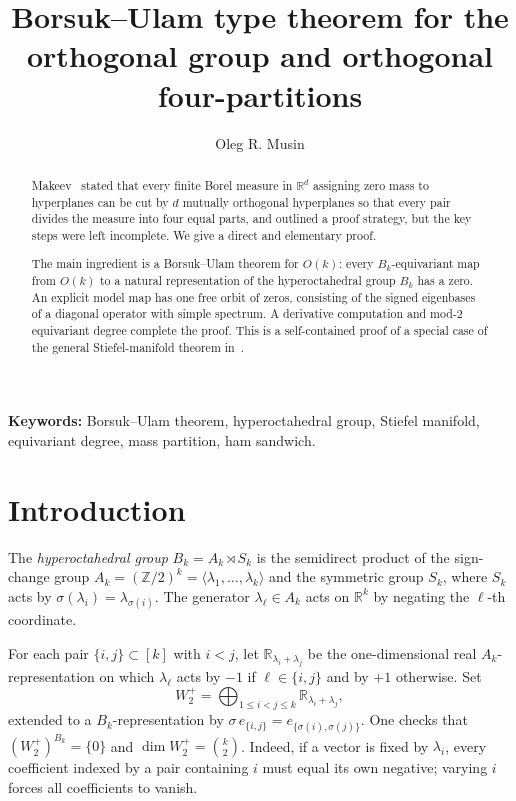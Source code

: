 \documentclass[12pt]{article}
\title{Borsuk--Ulam type theorem for the \\
orthogonal group and orthogonal four-partitions}
\author{Oleg R. Musin}
\date{}
\begin{document}
\maketitle

\begin{abstract}
Makeev~\cite{Mak07} stated that every finite Borel measure in $\mathbb R^d$ assigning
zero mass to hyperplanes can be cut by $d$ mutually orthogonal
hyperplanes so that every pair divides the measure into four equal
parts, and outlined a proof strategy, but the key steps were left
incomplete.  We give a direct and elementary proof.

The main ingredient is a Borsuk--Ulam theorem for $O(k)$: every
$B_k$-equivariant map from $O(k)$ to a natural representation of the
hyperoctahedral group $B_k$ has a zero.  An explicit model map has one
free orbit of zeros, consisting of the signed eigenbases of a diagonal
operator with simple spectrum.  A derivative computation and mod-$2$
equivariant degree complete the proof.  This is a self-contained proof
of a special case of the general Stiefel-manifold theorem in~\cite{Mus26}.
\end{abstract}

\medskip
\noindent\textbf{Keywords:} Borsuk--Ulam theorem, hyperoctahedral group,
Stiefel manifold, equivariant degree, mass partition, ham sandwich.

\section{Introduction}

The \emph{hyperoctahedral group} $B_k = A_k \rtimes S_k$ is the
semidirect product of the sign-change group
$A_k = (\mathbb{Z}/2)^k = \langle\lambda_1,\ldots,\lambda_k\rangle$
and the symmetric group $S_k$, where $S_k$ acts by
$\sigma(\lambda_i)=\lambda_{\sigma(i)}$.
The generator $\lambda_\ell \in A_k$ acts on $\mathbb{R}^k$ by
negating the $\ell$-th coordinate.

For each pair $\{i,j\}\subset[k]$ with $i<j$, let
$\mathbb{R}_{\lambda_i+\lambda_j}$ be the one-dimensional real
$A_k$-representation on which $\lambda_\ell$ acts by $-1$ if
$\ell\in\{i,j\}$ and by $+1$ otherwise.  Set
\[
 W_2^+ = \bigoplus_{1\le i<j\le k}\mathbb{R}_{\lambda_i+\lambda_j},
\]
extended to a $B_k$-representation by
$\sigma\,e_{\{i,j\}}=e_{\{\sigma(i),\sigma(j)\}}$.
One checks that $(W_2^+)^{B_k}=\{0\}$ and
$\dim W_2^+=\binom{k}{2}$.  Indeed, if a vector is fixed by
$\lambda_i$, every coefficient indexed by a pair containing $i$ must
equal its own negative; varying $i$ forces all coefficients to vanish.
\end{document}
